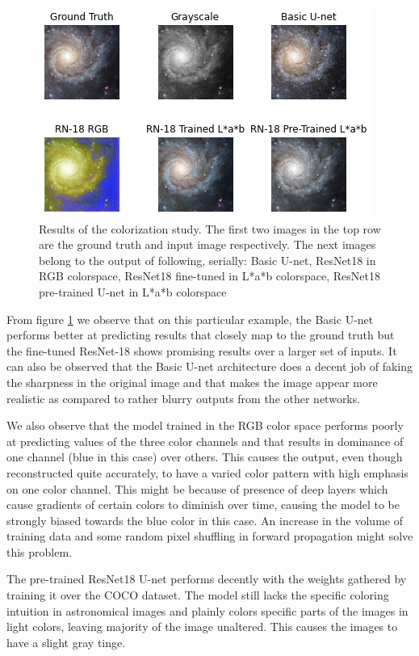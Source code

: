 \documentclass[oneside,a4paper,12pt]{report}
\begin{document}
\begin{figure}[!htb]
	\includegraphics[width=\textwidth]{figures/comparison_color}
	\caption{Results of the colorization study. The first two images in the top row are the ground truth and input image respectively. The next images belong to the output of following, serially: Basic U-net, ResNet18 in RGB colorspace, ResNet18 fine-tuned in L*a*b colorspace, ResNet18 pre-trained U-net in L*a*b colorspace}
	\label{color_results}
\end{figure}

From figure \ref{color_results} we observe that on this particular example, the Basic U-net performs better at predicting results that closely map to the ground truth but the fine-tuned ResNet-18 shows promising results over a larger set of inputs. It can also be observed that the Basic U-net architecture does a decent job of faking the sharpness in the original image and that makes the image appear more realistic as compared to rather blurry outputs from the other networks. 

We also observe that the model trained in the RGB color space performs poorly at predicting values of the three color channels and that results in dominance of one channel (blue in this case) over others. This causes the output, even though reconstructed quite accurately, to have a varied color pattern with high emphasis on one color channel. This might be because of presence of deep layers which cause gradients of certain colors to diminish over time, causing the model to be strongly biased towards the blue color in this case. An increase in the volume of training data and some random pixel shuffling in forward propagation might solve this problem. 

The pre-trained ResNet18 U-net performs decently with the weights gathered by training it over the COCO dataset. The model still lacks the specific coloring intuition in astronomical images and plainly colors specific parts of the images in light colors, leaving majority of the image unaltered. This causes the images to have a slight gray tinge.
\end{document}
